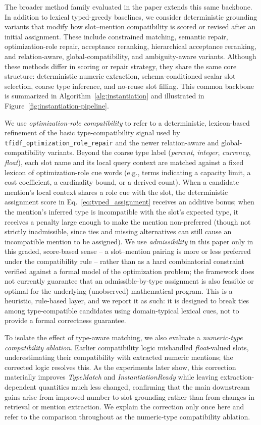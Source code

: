 \documentclass[pdflatex,sn-basic,Numbered]{sn-jnl}
\begin{document}
The broader method family evaluated in the paper extends this same backbone. In addition to lexical typed-greedy baselines, we consider deterministic grounding variants that modify how slot--mention compatibility is scored or revised after an initial assignment. These include constrained matching, semantic repair, optimization-role repair, acceptance reranking, hierarchical acceptance reranking, and relation-aware, global-compatibility, and ambiguity-aware variants. Although these methods differ in scoring or repair strategy, they share the same core structure: deterministic numeric extraction, schema-conditioned scalar slot selection, coarse type inference, and no-reuse slot filling. This common backbone is summarized in Algorithm~\ref{alg:instantiation} and illustrated in Figure~\ref{fig:instantiation-pipeline}.

We use \emph{optimization-role compatibility} to refer to a deterministic, lexicon-based refinement of the basic type-compatibility signal used by \texttt{tfidf\_optimization\_role\_repair} and the newer relation-aware and global-compatibility variants. Beyond the coarse type label (\emph{percent}, \emph{integer}, \emph{currency}, \emph{float}), each slot name and its local query context are matched against a fixed lexicon of optimization-role cue words (e.g., terms indicating a capacity limit, a cost coefficient, a cardinality bound, or a derived count). When a candidate mention's local context shares a role cue with the slot, the deterministic assignment score in Eq.~\eqref{eq:typed_assignment} receives an additive bonus; when the mention's inferred type is incompatible with the slot's expected type, it receives a penalty large enough to make the mention non-preferred (though not strictly inadmissible, since ties and missing alternatives can still cause an incompatible mention to be assigned). We use \emph{admissibility} in this paper only in this graded, score-based sense -- a slot--mention pairing is more or less preferred under the compatibility rule -- rather than as a hard combinatorial constraint verified against a formal model of the optimization problem; the framework does not currently guarantee that an admissible-by-type assignment is also feasible or optimal for the underlying (unobserved) mathematical program. This is a heuristic, rule-based layer, and we report it as such: it is designed to break ties among type-compatible candidates using domain-typical lexical cues, not to provide a formal correctness guarantee.

To isolate the effect of type-aware matching, we also evaluate a \emph{numeric-type compatibility ablation}. Earlier compatibility logic mishandled \emph{float}-valued slots, underestimating their compatibility with extracted numeric mentions; the corrected logic resolves this. As the experiments later show, this correction materially improves \textit{TypeMatch} and \textit{InstantiationReady} while leaving extraction-dependent quantities much less changed, confirming that the main downstream gains arise from improved number-to-slot grounding rather than from changes in retrieval or mention extraction. We explain the correction only once here and refer to the comparison throughout as the numeric-type compatibility ablation.
\end{document}
